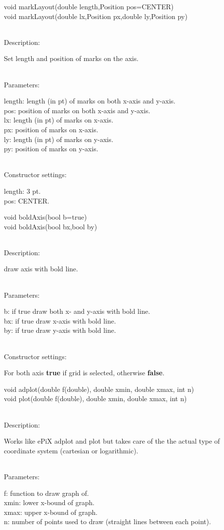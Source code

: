 \documentclass[12pt,a4paper]{article}
\newcommand{\memberitem}[1]{
                              \vspace{-0.5pc}
                              \end{minipage}\\
                              \phantom{M}#1:\\
                              \phantom{MM}
                              \begin{minipage}[t]{12cm}

                           }
\newcommand{\memdsc}{\memberitem{Description}}
\newcommand{\meminp}{\memberitem{Parameters}}
\newcommand{\memdef}{\memberitem{Constructor settings}}
\newenvironment{MemberDescr}
  {
    \begin{minipage}{15cm}
    \bf
  }
  {
    \end{minipage}
  }
\begin{document}
  \begin{MemberDescr}
    void markLayout(double length,Position pos=CENTER)\\
    void markLayout(double lx,Position px,double ly,Position py)\\
    \memdsc
      Set length and position of marks on the axis.\\
    \meminp
      length: length (in pt) of marks on both x-axis and y-axis.\\
      pos:    position of marks on both x-axis and y-axis.\\
      lx:     length (in pt) of marks on x-axis.\\
      px:     position of marks on x-axis.\\
      ly:     length (in pt) of marks on y-axis.\\
      py:     position of marks on y-axis.\\
    \memdef
      length: 3 pt.\\
      pos:    CENTER.\\
  \end{MemberDescr}

  \begin{MemberDescr}
    void boldAxis(bool b=true)\\
    void boldAxis(bool bx,bool by)\\
    \memdsc
      draw axis with bold line.\\
    \meminp
      b:  if true draw both x- and y-axis with bold line.\\
      bx: if true draw x-axis with bold line.\\
      by: if true draw y-axis with bold line.\\
    \memdef
      For both axis \textbf{true} if grid is selected, otherwise \textbf{false}.\\
  \end{MemberDescr}

  \begin{MemberDescr}
    void adplot(double f(double), double xmin, double xmax, int n)\\
    void plot(double f(double), double xmin, double xmax, int n)\\
    \memdsc
      Works like ePiX adplot and plot but takes care of the the actual type of
      coordinate system (cartesian or logarithmic).\\
    \meminp
      f: function to draw graph of.\\
      xmin: lower x-bound of graph.\\
      xmax: upper x-bound of graph.\\
      n: number of points used to draw (straight lines between each point).\\
  \end{MemberDescr}
\end{document}
